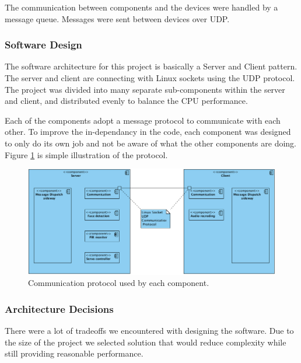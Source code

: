 \documentclass[11pt,a4paper,titlepage]{report}
\begin{document}
The communication between components and the devices were handled by a message queue. Messages were sent between devices over UDP.



\subsubsection{Software Design}


The software architecture for this project is basically a Server and Client pattern. The server and client are connecting with Linux sockets using the UDP protocol. The project was divided into many separate sub-components within the server and client, and distributed evenly to balance the CPU performance. 

Each of the components adopt a message protocol to communicate with each other. To improve the in-dependancy in the code, each component was designed to only do its own job and not be aware of what the other components are doing. Figure \ref{fig:udp} is simple illustration of the protocol.


\begin{figure}
\centering
\includegraphics[width=\textwidth]{graphs/udp.png}
\caption{Communication protocol used by each component.}
\label{fig:udp}
\end{figure}



\subsubsection{Architecture Decisions}

There were a lot of tradeoffs we encountered with designing the software. Due to the size of the project we selected solution that would reduce complexity while still providing reasonable performance.
\end{document}
